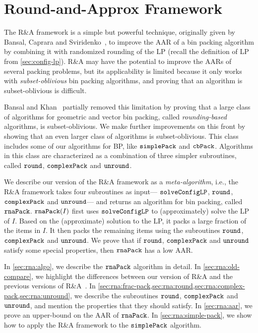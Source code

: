 \section{Round-and-Approx Framework}
\label{sec:rna}

The R\&A framework is a simple but powerful technique,
originally given by Bansal, Caprara and Sviridenko~\cite{rna},
to improve the AAR of a bin packing algorithm by combining it with
randomized rounding of the \config{} LP
(recall the definition of \config{} LP from \cref{sec:config-lp}).
R\&A may have the potential to improve the AARs of several packing problems,
but its applicability is limited because
it only works with \emph{subset-oblivious} bin packing algorithms,
and proving that an algorithm is subset-oblivious is difficult.

Bansal and Khan~\cite{bansal2014binpacking} partially removed this limitation
by proving that a large class of algorithms for geometric and vector bin packing,
called \emph{rounding-based} algorithms, is subset-oblivious.
We make further improvements on this front by showing that an even larger class
of algorithms is subset-oblivious.
This class includes some of our algorithms for  BP,
like $\operatorname{\mathtt{simplePack}}$ and $\operatorname{\mathtt{cbPack}}$.
Algorithms in this class are characterized as a combination of
three simpler subroutines, called $\operatorname{\mathtt{round}}$, $\operatorname{\mathtt{complexPack}}$ and $\operatorname{\mathtt{unround}}$.

We describe our version of the R\&A framework as a \emph{meta-algorithm},
i.e., the R\&A framework takes four subroutines as input---%
$\operatorname{\mathtt{solveConfigLP}}$, $\operatorname{\mathtt{round}}$, $\operatorname{\mathtt{complexPack}}$ and $\operatorname{\mathtt{unround}}$---%
and returns an algorithm for bin packing, called $\operatorname{\mathtt{rnaPack}}$.
$\operatorname{\mathtt{rnaPack}}(I)$ first uses $\operatorname{\mathtt{solveConfigLP}}$ to (approximately) solve the \config{} LP of $I$.
Based on the (approximate) solution to the \config{} LP,
it packs a large fraction of the items in $I$.
It then packs the remaining items using the subroutines
$\operatorname{\mathtt{round}}$, $\operatorname{\mathtt{complexPack}}$ and $\operatorname{\mathtt{unround}}$.
We prove that if $\operatorname{\mathtt{round}}$, $\operatorname{\mathtt{complexPack}}$ and $\operatorname{\mathtt{unround}}$ satisfy some special properties,
then $\operatorname{\mathtt{rnaPack}}$ has a low AAR.

In \cref{sec:rna:algo}, we describe the $\operatorname{\mathtt{rnaPack}}$ algorithm in detail.
In \cref{sec:rna:old-compare}, we highlight the differences between our version of R\&A
and the previous versions of R\&A~\cite{rna,bansal2014binpacking}.
In \cref{sec:rna:frac-pack,sec:rna:round,sec:rna:complex-pack,sec:rna:unround},
we describe the subroutines $\operatorname{\mathtt{round}}$, $\operatorname{\mathtt{complexPack}}$ and $\operatorname{\mathtt{unround}}$,
and mention the properties that they should satisfy.
In \cref{sec:rna:aar}, we prove an upper-bound on the AAR of $\operatorname{\mathtt{rnaPack}}$.
In \cref{sec:rna:simple-pack}, we show how to apply the R\&A framework
to the $\operatorname{\mathtt{simplePack}}$ algorithm.

